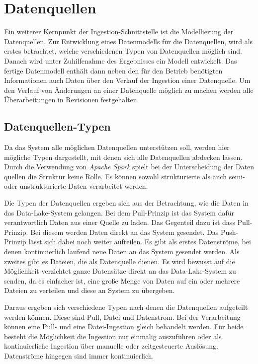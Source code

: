 \section{Datenquellen}
Ein weiterer Kernpunkt der Ingestion-Schnittstelle ist die Modellierung der Datenquellen.
Zur Entwicklung eines Datenmodells für die Datenquellen, wird als erstes betrachtet, welche verschiedenen Typen von Datenquellen möglich sind.
Danach wird unter Zuhilfenahme des Ergebnisses ein Modell entwickelt.
Das fertige Datenmodell enthält dann neben den für den Betrieb benötigten Informationen auch Daten über den Verlauf der Ingestion einer Datenquelle.
Um den Verlauf von Änderungen an einer Datenquelle möglich zu machen werden alle Überarbeitungen in Revisionen festgehalten.

\subsection{Datenquellen-Typen}
\label{sec:datasource-types}

Da das System alle möglichen Datenquellen unterstützen soll, werden hier mögliche Typen dargestellt, mit denen sich alle Datenquellen abdecken lassen.
Durch die Verwendung von \textit{Apache Spark} spielt bei der Unterscheidung der Daten quellen die Struktur keine Rolle.
Es können sowohl strukturierte als auch semi- oder unstrukturierte Daten verarbeitet werden.

Die Typen der Datenquellen ergeben sich aus der Betrachtung, wie die Daten in das Data-Lake-System gelangen.
Bei dem Pull-Prinzip ist das System dafür verantwortlich Daten aus einer Quelle zu laden.
Das Gegenteil dazu ist dass Pull-Prinzip.
Bei diesem werden Daten direkt an das System gesendet.
Das Push-Prinzip lässt sich dabei noch weiter aufteilen.
Es gibt als erstes Datenströme, bei denen kontinuierlich laufend neue Daten an das System gesendet werden.
Als zweites gibt es Dateien, die als Datenquelle dienen.
Es wird bewusst auf die Möglichkeit verzichtet ganze Datensätze direkt an das Data-Lake-System zu senden, da es einfacher ist, eine große Menge von Daten auf ein oder mehrere Dateien zu verteilen und diese an System zu übergeben.

Daraus ergeben sich verschiedene Typen nach denen die Datenquellen aufgeteilt werden können.
Diese sind Pull, Datei und Datenstrom.
Bei der Verarbeitung können eine Pull- und eine Datei-Ingestion gleich behandelt werden.
Für beide besteht die Möglichkeit die Ingestion nur einmalig auszuführen oder als kontinuierliche Ingestion über manuelle oder zeitgesteuerte Auslösung.
Datenströme hingegen sind immer kontinuierlich.

